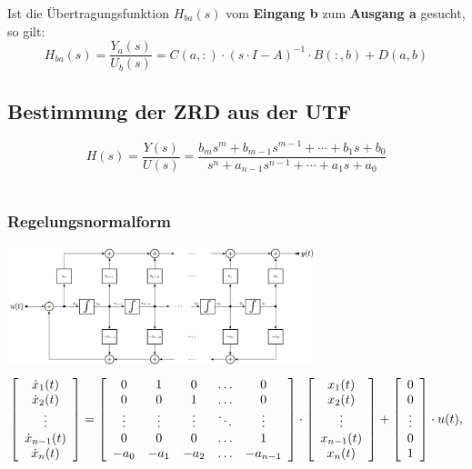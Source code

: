   Ist die Übertragungsfunktion $H_{ba}(s)$ vom \textbf{Eingang b} zum \textbf{Ausgang a} gesucht, so gilt:
  \[
    H_{ba}(s) = \frac{Y_a(s)}{U_b(s)} = C(a,:) \cdot (s \cdot I -A)^{-1} \cdot B(:,b) + D(a,b)
  \]


\subsection{Bestimmung der ZRD aus der UTF }
  \[ \boxed{
  H(s)=\frac{Y(s)}{U(s)}=\frac{b_{m} s^{m} + b_{m-1} s^{m-1} +\cdots+b_{1} s 
  + b_{0}}{s^{n} + a_{n-1} s^{n-1} + \cdots + a_{1} s + a_{0}}}
  \]\\


\subsubsection{Regelungsnormalform }
  \includegraphics[width=9cm]{./images/zrd-regelungsnormalform.png} \\
  \scriptsize
  \begin{equation*}
    \left [ 
    \begin{array}{c}
      \dot{x}_1(t)\\
      \dot{x}_2(t)\\
      \vdots\\
      \dot{x}_{n-1}(t)\\
      \dot{x}_{n}(t)\\
    \end{array}
    \right ] =
    \left [ 
    \begin{array}{c c c c c}
      0 & 1 & 0 & \ldots & 0\\
      0 & 0 & 1 & \ldots & 0\\
      \vdots & \vdots & \vdots & \ddots & \vdots\\
      0 & 0 & 0 & \ldots & 1\\
      -a_0 & -a_1 & -a_2 & \ldots & -a_{n-1}\\
    \end{array}
    \right ]\cdot
    \left [ 
    \begin{array}{c}
      x_1(t)\\
      x_2(t)\\
      \vdots \\
      x_{n-1}(t)\\
      x_{n}(t)\\
    \end{array}
    \right ]+
    \left [ 
    \begin{array}{c}
      0 \\
      0\\
      \vdots\\
      0\\
      1\\
    \end{array}
    \right ]\cdot
    u(t),
  \end{equation*}
